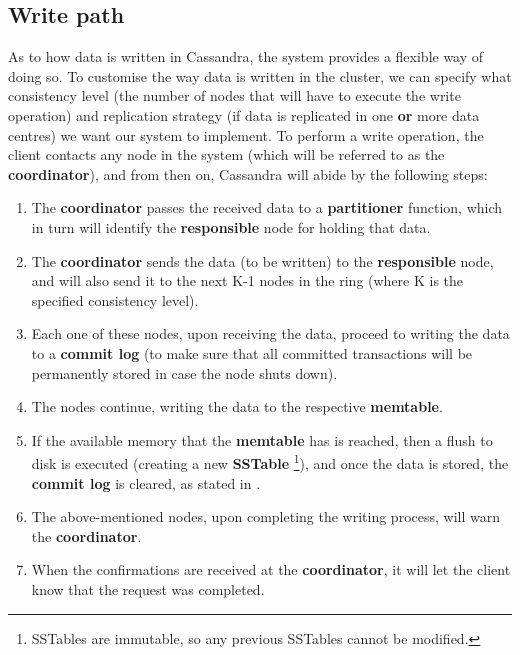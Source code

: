 \documentclass[runningheads]{llncs}
\begin{document}
\subsection{Write path}
As to how data is written in Cassandra, the system provides a flexible way of doing so. To customise the way data is written in the cluster, we can specify what consistency level (the number of nodes that will have to execute the write operation) and replication strategy (if data is replicated in one \textbf{or} more data centres) we want our system to implement. To perform a write operation, the client contacts any node in the system (which will be referred to as the \textbf{coordinator}), and from then on, Cassandra will abide by the following steps:
\begin{enumerate}
    \item The \textbf{coordinator} passes the received data to a \textbf{partitioner} function, which in turn will identify the \textbf{responsible} node for holding that data.
    \item The \textbf{coordinator} sends the data (to be written) to the \textbf{responsible} node, and will also send it to the next K-1 nodes in the ring (where K is the specified consistency level).
    \item Each one of these nodes, upon receiving the data, proceed to writing the data to a \textbf{commit log} (to make sure that all committed transactions will be permanently stored in case the node shuts down).
    \item The nodes continue, writing the data to the respective \textbf{memtable}.
    \item If the available memory that the \textbf{memtable} has is reached, then a flush to disk is executed (creating a new \textbf{SSTable} \footnote{SSTables are immutable, so any previous SSTables cannot be modified.}), and once the data is stored, the \textbf{commit log} is cleared, as stated in \cite{dzone}.
    \item The above-mentioned nodes, upon completing the writing process, will warn the \textbf{coordinator}.
    \item When the confirmations are received at the \textbf{coordinator}, it will let the client know that the request was completed.
\end{enumerate}
\end{document}
